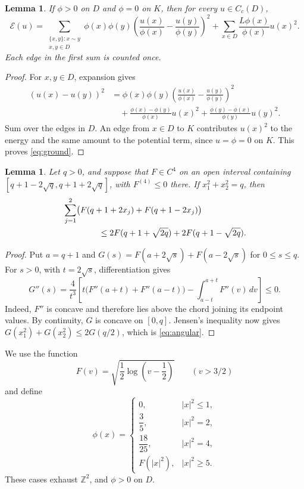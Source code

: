 \documentclass[11pt]{amsart}
\newtheorem{lemma}[theorem]{Lemma}
\numberwithin{equation}{section}
\newcommand{\Z}{\mathbb Z}
\newcommand{\E}{\mathcal E}
\newcommand{\Cc}{C_c}
\begin{document}
\begin{lemma}\label{lem:ground}
If $\phi>0$ on $D$ and $\phi=0$ on $K$, then for every $u\in\Cc(D)$,
\begin{equation}\label{eq:ground}
\E(u)=
\sum_{\substack{\{x,y\}:x\sim y\\x,y\in D}}
\phi(x)\phi(y)
\left(\frac{u(x)}{\phi(x)}-\frac{u(y)}{\phi(y)}\right)^2
+\sum_{x\in D}\frac{L\phi(x)}{\phi(x)}u(x)^2.
\end{equation}
Each edge in the first sum is counted once.
\end{lemma}

\begin{proof}
For $x,y\in D$, expansion gives
\begin{align*}
(u(x)-u(y))^2
&=\phi(x)\phi(y)
\left(\frac{u(x)}{\phi(x)}-\frac{u(y)}{\phi(y)}\right)^2\\
&\quad+\frac{\phi(x)-\phi(y)}{\phi(x)}u(x)^2
+\frac{\phi(y)-\phi(x)}{\phi(y)}u(y)^2.
\end{align*}
Sum over the edges in $D$. An edge from $x\in D$ to $K$ contributes
$u(x)^2$ to the energy and the same amount to the potential term,
since $u=\phi=0$ on $K$. This proves \eqref{eq:ground}.
\end{proof}

\begin{lemma}\label{lem:angular}
Let $q>0$, and suppose that $F\in C^4$ on an open interval containing
$[q+1-2\sqrt q,q+1+2\sqrt q]$, with $F^{(4)}\le0$ there.
If $x_1^2+x_2^2=q$, then
\begin{align}
&\sum_{j=1}^2\bigl(F(q+1+2x_j)+F(q+1-2x_j)\bigr)\notag\\
&\hspace{15mm}\le
2F(q+1+\sqrt{2q})+2F(q+1-\sqrt{2q}).\label{eq:angular}
\end{align}
\end{lemma}

\begin{proof}
Put $a=q+1$ and
$G(s)=F(a+2\sqrt s)+F(a-2\sqrt s)$ for $0\le s\le q$.
For $s>0$, with $t=2\sqrt s$, differentiation gives
\[
G''(s)=\frac4{t^3}
\left[
t\bigl(F''(a+t)+F''(a-t)\bigr)
-\int_{a-t}^{a+t}F''(v)\,dv
\right]\le0.
\]
Indeed, $F''$ is concave and therefore lies above the chord joining
its endpoint values. By continuity, $G$ is concave on $[0,q]$.
Jensen's inequality now gives
$G(x_1^2)+G(x_2^2)\le2G(q/2)$, which is \eqref{eq:angular}.
\end{proof}

We use the function
\[
F(v)=\sqrt{\frac12\log\left(v-\frac12\right)}\qquad(v>3/2)
\]
and define
\begin{equation}\label{eq:phi}
\phi(x)=
\begin{cases}
0,&|x|^2\le1,\\[1mm]
\dfrac35,&|x|^2=2,\\[2mm]
\dfrac{18}{25},&|x|^2=4,\\[2mm]
F(|x|^2),&|x|^2\ge5.
\end{cases}
\end{equation}
These cases exhaust $\Z^2$, and $\phi>0$ on $D$.
\end{document}

